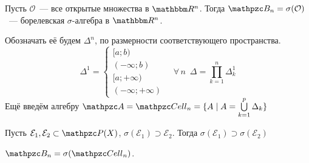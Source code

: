 \documentclass[12pt, timbord]{../../../notes}
\begin{document}
\begin{defn}\label{defn:meas::setsys::borel}
  Пусть $\mathcal O$~--- все открытые множества в $\R^n$. Тогда $\mathpzc B_n = \sigma(\mathcal O)
  $~--- борелевская $\sigma$-алгебра в $\R^n$.
\end{defn}

\begin{defn}[Ячейка в $\R^n$ ]\label{defn:meas::setsys::cell}
  Обозначать её будем $\Delta^n$, по размерности соответствующего пространства.
  \[
    \Delta^1 = \begin{cases}
      [a;b) \\
      (-\infty;b) \\
      [a;+\infty) \\
      (-\infty;+\infty)
    \end{cases} \quad
    \forall\, n \;\: \Delta = \prod_{k=1}^n \Delta^1 _k 
  \]
  Ещё введём алгебру $\alg = \Cell_n = \{ A \mid A = \bigcup_{k=1}^p \Delta_k\}$
\end{defn} 

\begin{lem}\label{lem:meas::setsys::algsubset}
  Пусть $\mathcal E_1, \mathcal E_2 \subset \pset(X)$, $\sigma(\mathcal E_1) \supset \mathcal E_2$.
  Тогда $\sigma(\mathcal E_1) \supset \sigma(\mathcal E_2)$
\end{lem}
\begin{thrm}\label{thrm:meas::setsys::borelcell}
  $\mathpzc B_n = \sigma(\Cell_n)$.
\end{thrm}
\end{document}
